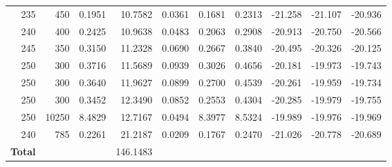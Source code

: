 \begin{landscape}
\begin{footnotesize}
\begin{longtable}{r r r r r r r r r r}
235 & 450 & 0.1951 & 10.7582 & 0.0361 & 0.1681 & 0.2313 & -21.258 & -21.107 & -20.936 \\
240 & 400 & 0.2425 & 10.9638 & 0.0483 & 0.2063 & 0.2908 & -20.913 & -20.750 & -20.566 \\
245 & 350 & 0.3150 & 11.2328 & 0.0690 & 0.2667 & 0.3840 & -20.495 & -20.326 & -20.125 \\
250 & 300 & 0.3716 & 11.5689 & 0.0939 & 0.3026 & 0.4656 & -20.181 & -19.973 & -19.743 \\
250 & 300 & 0.3640 & 11.9627 & 0.0899 & 0.2700 & 0.4539 & -20.261 & -19.959 & -19.734 \\
250 & 300 & 0.3452 & 12.3490 & 0.0852 & 0.2553 & 0.4304 & -20.285 & -19.979 & -19.755 \\
250 & 10250 & 8.4829 & 12.7167 & 0.0494 & 8.3977 & 8.5324 & -19.989 & -19.976 & -19.969 \\
240 & 785 & 0.2261 & 21.2187 & 0.0209 & 0.1767 & 0.2470 & -21.026 & -20.778 & -20.689 \\
\midrule
\textbf{Total} &  &  & 146.1483 &  &  &  &  &  &  \\
\end{longtable}
\end{footnotesize}
\end{landscape}


